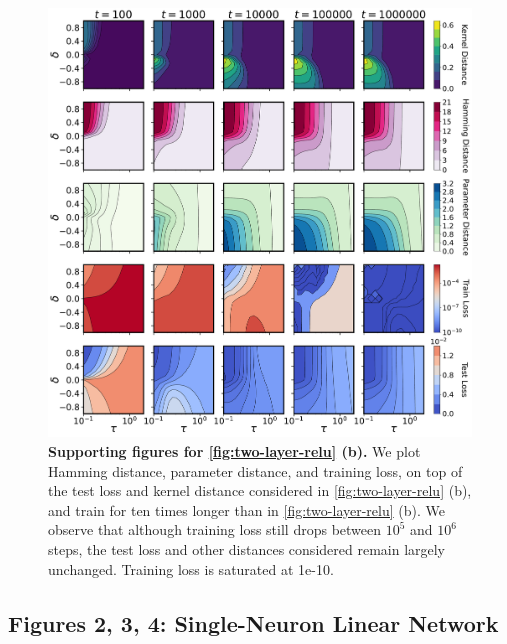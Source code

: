 \documentclass{article}
\theoremstyle{plain}
\theoremstyle{definition}
\theoremstyle{remark}
\begin{document}
\begin{figure}[H] 
    \centering
    \includegraphics[width=\columnwidth]{fig/two-layer/supporting_other_v3.pdf}
    \caption{\textbf{Supporting figures for \cref{fig:two-layer-relu} (b).} We plot Hamming distance, parameter distance, and training loss, on top of the test loss and kernel distance considered in \cref{fig:two-layer-relu} (b), and train for ten times longer than in \cref{fig:two-layer-relu} (b). We observe that although training loss still drops between $10^5$ and $10^6$ steps, the test loss and other distances considered remain largely unchanged. Training loss is saturated at 1e-10.}
    \label{fig:two-layer-supporting}
\end{figure}

\subsection{Figures 2, 3, 4: Single-Neuron Linear Network}
\label{app:experimental-details-single-neuron}
\end{document}
